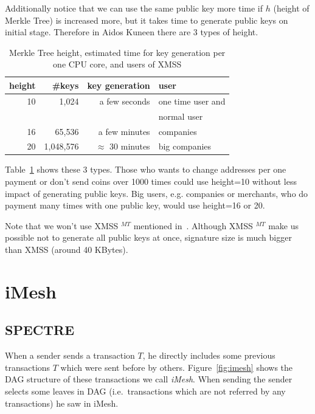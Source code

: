 \documentclass[a4paper,10pt,twocolumn]{article}
\begin{document}
Additionally notice that we can use the same public key more time
if \(h\) (height of Merkle Tree) is increased more, but it takes time to generate public keys on initial stage.
Therefore in Aidos Kuneen there are 3 types of height.

\begin{table}[ht]
	\caption{Merkle Tree height, estimated time for key generation per one CPU core, and users of XMSS}
    \label{tbl:height}
	\begin{tabular}{rrrl} 
		\toprule
		height  & \#keys & key generation & user \\ 
		\midrule
			  10 & 1,024 &  a few seconds & one time user  and\\
			  & & & normal user \\
			  16 & 65,536 & a few minutes & companies\\
			  20 & 1,048,576 & \( \approx \) 30 minutes &  big companies\\ 
			  \bottomrule
			\end{tabular}
  \end{table}

Table~\ref{tbl:height} shows these 3 types. Those who wants to change addresses
per one payment or don't send coins over 1000 times  
could use height=10 without less impact of generating public keys. Big users, e.g.
companies or merchants, who do payment many times with one public key, would use height=16 or 20.

Note that we won't use XMSS \(^{MT}\) mentioned in~\cite{ietf}. 
Although XMSS \(^{MT}\) make us possible not to generate all public keys at once,
signature size is much bigger than XMSS (around 40 KBytes).


\section{iMesh}
\label{sec:imesh}

\subsection{SPECTRE}
When a sender sends a transaction \(T\),  he directly includes some previous transactions \(T\) which were sent before by others. 
Figure~\ref{fig:imesh} shows the DAG structure of these transactions we call \emph{iMesh}. When sending
the sender selects some leaves in DAG (i.e.\ transactions which are not referred by any transactions) he saw in iMesh.
\end{document}
